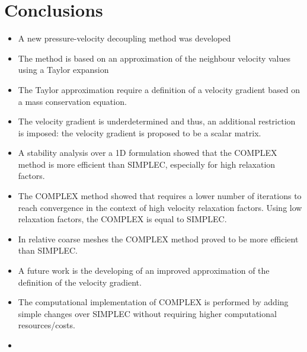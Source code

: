 \documentclass[final,3p,times,10pt,onecolumn]{myElsarticle}
\numberwithin{equation}{section}
\begin{document}
\section{Conclusions}
\label{sec:conclusions}

\begin{itemize}
\item A new pressure-velocity decoupling method was developed
\item The method is based on an approximation of the neighbour velocity values using a Taylor expansion
\item The Taylor approximation require a definition of a velocity gradient based on a mass conservation equation.
\item The velocity gradient is underdetermined and thus, an additional restriction is imposed: the velocity gradient is proposed to be a scalar matrix. 
\item A stability analysis over a 1D formulation showed that the COMPLEX method is more efficient than SIMPLEC, especially for high relaxation factors.
\item The COMPLEX method showed that requires a lower number of iterations to reach convergence in the context of high velocity relaxation factors. Using low relaxation factors, the COMPLEX is equal to SIMPLEC.
\item In relative coarse meshes the COMPLEX method proved to be more efficient than SIMPLEC.
\item A future work is the developing of an improved approximation of the definition of the velocity gradient.
\item The computational implementation of COMPLEX is performed by adding simple changes over SIMPLEC without requiring  higher computational resources/costs. 
\item 
\end{itemize}



\end{document}
